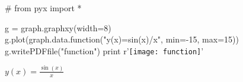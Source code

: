 \documentclass{article}
\begin{document}
\begin{figure}
\centering
\begin{python}
#
from pyx import *

g = graph.graphxy(width=8)
g.plot(graph.data.function("y(x)=sin(x)/x", min=-15, max=15))
g.writePDFfile("function")
print r'\texttt{[image: function]}'
\end{python}
\caption{$y(x)=\frac{\sin(x)}{x}$}
\end{figure}
\end{document}
